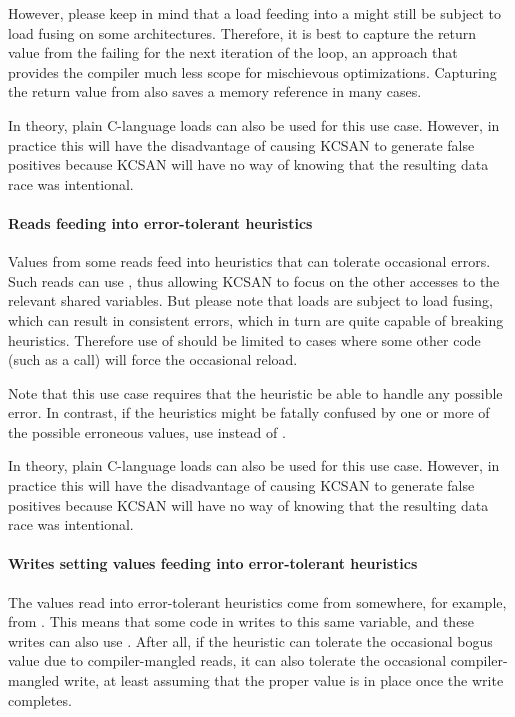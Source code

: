 However, please keep in mind that a  load feeding into
a  might still be subject to load fusing on some
architectures.
Therefore, it is best to capture the return value from the failing
 for the next iteration of the loop, an approach that
provides the compiler much less scope for mischievous optimizations.
Capturing the return value from  also saves a memory reference
in many cases.

In theory, plain C-language loads can also be used for this use case.
However, in practice this will have the disadvantage of causing KCSAN
to generate false positives because KCSAN will have no way of knowing
that the resulting data race was intentional.


\paragraph{Reads feeding into error-tolerant heuristics}

Values from some reads feed into heuristics that can tolerate occasional
errors.
Such reads can use , thus allowing KCSAN to focus on
the other accesses to the relevant shared variables.
But please note that  loads are subject to load fusing,
which can result in consistent errors, which in turn are quite capable
of breaking heuristics.
Therefore use of  should be limited to cases where some other
code (such as a  call) will force the occasional reload.

Note that this use case requires that the heuristic be able to handle
any possible error.
In contrast, if the heuristics might be fatally confused by one or more of
the possible erroneous values, use  instead of .

In theory, plain C-language loads can also be used for this use case.
However, in practice this will have the disadvantage of causing KCSAN
to generate false positives because KCSAN will have no way of knowing
that the resulting data race was intentional.


\paragraph{Writes setting values feeding into error-tolerant heuristics}

The values read into error-tolerant heuristics come from somewhere,
for example, from .
This means that some code in  writes to this same variable,
and these writes can also use .
After all, if the heuristic can tolerate the occasional bogus value
due to compiler-mangled reads, it can also tolerate the occasional
compiler-mangled write, at least assuming that the proper value is in
place once the write completes.


